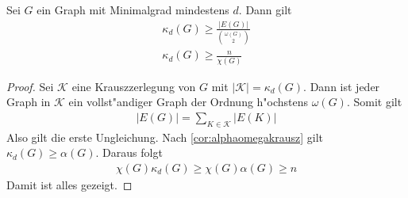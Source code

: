 \begin{theorem}
  \label{thm:omegakrauszabsch}
  Sei $G$ ein Graph mit Minimalgrad mindestens $d$. Dann gilt
  \begin{align*}
    \kappa_{d}(G) \geq \frac{|E(G)|}{{\omega(G) \choose 2}} \\
    \kappa_{d}(G) \geq \frac{n}{\chi(G)}
  \end{align*}
\end{theorem}

\begin{proof}
  Sei $\mathcal{K}$ eine Krauszzerlegung von $G$ mit $|\mathcal{K}| = \kappa_{d}(G)$. Dann ist jeder Graph in $\mathcal{K}$ ein vollst"andiger Graph der Ordnung h"ochstens $\omega(G)$. Somit gilt
  \begin{align*}
    |E(G)| = \sum\limits_{K\in \mathcal{K}} |E(K)| 
  \end{align*} 
  Also gilt die erste Ungleichung. 
  Nach \ref{cor:alphaomegakrausz} gilt $\kappa_{d}(G) \geq \alpha(G)$. Daraus folgt 
  \begin{align*}
    \chi(G) \kappa_{d}(G) \geq \chi(G) \alpha(G) \geq n
  \end{align*}
  Damit ist alles gezeigt.
\end{proof}
